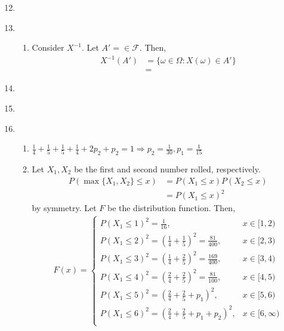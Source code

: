 \documentclass{article}
\newcommand{\inv}{^{-1}}
\begin{document}
		\begin{enumerate}[label=\textbf{Question \arabic*.}]
			\setcounter{enumi}{11}
			\item ~
			
			\item
			\begin{enumerate}[label=(\alph*)]
				\item Consider $X\inv$. Let $A'=\in\mathcal{F}$. Then,
				\begin{align*}
					X\inv(A')&=\{\omega\in\Omega : X(\omega)\in A'\}\\
					&=
				\end{align*}
			\end{enumerate}
			
			\item ~
			
			\item ~
			
			\item
			\begin{enumerate}[label=(\alph*)]
				\item $\frac{1}{4}+\frac{1}{5}+\frac{1}{5}+\frac{1}{4}+2p_2+p_2=1\Rightarrow p_2=\frac{1}{30}, p_1=\frac{1}{15}$
				
				\item Let $X_1, X_2$ be the first and second number rolled, respectively.
				\begin{align*}
					P(\max\{X_1, X_2\}\leq x)&=P(X_1\leq x)P(X_2\leq x)\\
					&=P(X_1\leq x)^2
				\end{align*}
				by symmetry. Let $F$ be the distribution function. Then,
				\begin{align*}
					F(x)=\begin{cases}
						P(X_1\leq1)^2=\frac{1}{16},&x\in[1, 2)\\
						P(X_1\leq2)^2=(\frac{1}{4}+\frac{1}{5})^2=\frac{81}{400},&x\in[2, 3)\\
						P(X_1\leq3)^2=(\frac{1}{4}+\frac{2}{5})^2=\frac{169}{400},&x\in[3, 4)\\
						P(X_1\leq4)^2=(\frac{2}{4}+\frac{2}{5})^2=\frac{81}{100},&x\in[4, 5)\\
						P(X_1\leq5)^2=(\frac{2}{4}+\frac{2}{5}+p_1)^2,&x\in[5, 6)\\
						P(X_1\leq6)^2=(\frac{2}{4}+\frac{2}{5}+p_1+p_2)^2,&x\in[6, \infty)\\
					\end{cases}
				\end{align*}
				

\end{enumerate}
\end{enumerate}
\end{document}
